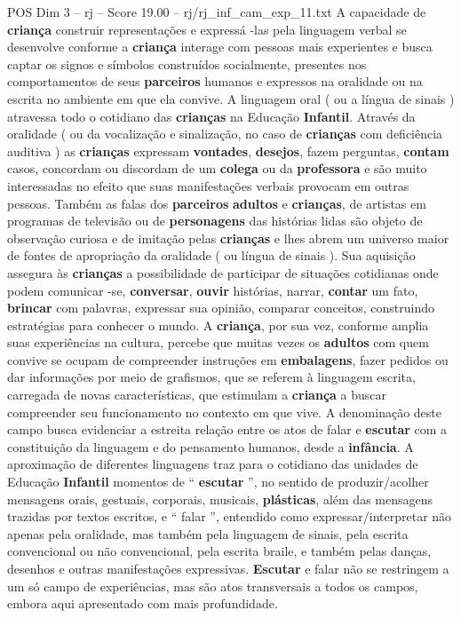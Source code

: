 \begin{textsample}{POS Dim 3 – rj – Score 19.00 – rj/rj\_inf\_cam\_exp\_11.txt}  \label{ex:f3_pos_012}
A capacidade de \textbf{criança} construir representações e expressá -las pela linguagem verbal se desenvolve conforme a \textbf{criança} interage com pessoas mais experientes e busca captar os signos e símbolos construídos socialmente, presentes nos comportamentos de seus \textbf{parceiros} humanos e expressos na oralidade ou na escrita no ambiente em que ela convive.
A linguagem oral ( ou a língua de sinais ) atravessa todo o cotidiano das \textbf{crianças} na Educação \textbf{Infantil}.
Através da oralidade ( ou da vocalização e sinalização, no caso de \textbf{crianças} com deficiência auditiva ) as \textbf{crianças} expressam \textbf{vontades}, \textbf{desejos}, fazem perguntas, \textbf{contam} casos, concordam ou discordam de um \textbf{colega} ou da \textbf{professora} e são muito interessadas no efeito que suas manifestações verbais provocam em outras pessoas.
Também as falas dos \textbf{parceiros} \textbf{adultos} e \textbf{crianças}, de artistas em programas de televisão ou de \textbf{personagens} das histórias lidas são objeto de observação curiosa e de imitação pelas \textbf{crianças} e lhes abrem um universo maior de fontes de apropriação da oralidade ( ou língua de sinais ).
Sua aquisição assegura às \textbf{crianças} a possibilidade de participar de situações cotidianas onde podem comunicar -se, \textbf{conversar}, \textbf{ouvir} histórias, narrar, \textbf{contar} um fato, \textbf{brincar} com palavras, expressar sua opinião, comparar conceitos, construindo estratégias para conhecer o mundo.
A \textbf{criança}, por sua vez, conforme amplia suas experiências na cultura, percebe que muitas vezes os \textbf{adultos} com quem convive se ocupam de compreender instruções em \textbf{embalagens}, fazer pedidos ou dar informações por meio de grafismos, que se referem à linguagem escrita, carregada de novas características, que estimulam a \textbf{criança} a buscar compreender seu funcionamento no contexto em que vive.
A denominação deste campo busca evidenciar a estreita relação entre os atos de falar e \textbf{escutar} com a constituição da linguagem e do pensamento humanos, desde a \textbf{infância}.
A aproximação de diferentes linguagens traz para o cotidiano das unidades de Educação \textbf{Infantil} momentos de “ \textbf{escutar} ”, no sentido de produzir/acolher mensagens orais, gestuais, corporais, musicais, \textbf{plásticas}, além das mensagens trazidas por textos escritos, e “ falar ”, entendido como expressar/interpretar não apenas pela oralidade, mas também pela linguagem de sinais, pela escrita convencional ou não convencional, pela escrita braile, e também pelas danças, desenhos e outras manifestações expressivas. \textbf{Escutar} e falar não se restringem a um só campo de experiências, mas são atos transversais a todos os campos, embora aqui apresentado com mais profundidade.

\end{textsample}
